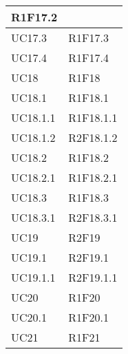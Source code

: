 \begin{center}
\begin{longtable}{|p{44mm}|p{22mm}|}
R1F17.2 \newline
\\
\hline
UC17.3 &

R1F17.3 \newline
\\
\hline
UC17.4 &

R1F17.4 \newline
\\
\hline
UC18 &

R1F18 \newline
\\
\hline
UC18.1 &

R1F18.1 \newline
\\
\hline
UC18.1.1 &

R1F18.1.1 \newline
\\
\hline
UC18.1.2 &

R2F18.1.2 \newline
\\
\hline
UC18.2 &

R1F18.2 \newline
\\
\hline
UC18.2.1 &

R1F18.2.1 \newline
\\
\hline
UC18.3 &

R1F18.3 \newline
\\
\hline
UC18.3.1 &

R2F18.3.1 \newline
\\
\hline
UC19 &

R2F19 \newline
\\
\hline
UC19.1 &

R2F19.1 \newline
\\
\hline
UC19.1.1 &

R2F19.1.1 \newline
\\
\hline
UC20 &

R1F20 \newline
\\
\hline
UC20.1 &

R1F20.1 \newline
\\
\hline
UC21 &

R1F21 \newline


\end{longtable}
\end{center}

